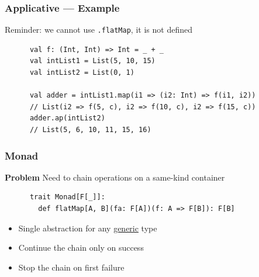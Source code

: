 \begin{frame}[fragile]
  \frametitle{Applicative --- Example}

  Reminder: we cannot use \texttt{.flatMap}, it is not defined
  \begin{example}[Usage]
    \begin{lstlisting}
      val f: (Int, Int) => Int = _ + _
      val intList1 = List(5, 10, 15)
      val intList2 = List(0, 1)

      val adder = intList1.map(i1 => (i2: Int) => f(i1, i2))
      // List(i2 => f(5, c), i2 => f(10, c), i2 => f(15, c))
      adder.ap(intList2)
      // List(5, 6, 10, 11, 15, 16)
    \end{lstlisting}
  \end{example}
\end{frame}

\begin{frame}[fragile]
  \frametitle{Monad}

  \textbf{Problem} Need to chain operations on a same-kind container

  \begin{definition}
    \begin{lstlisting}
      trait Monad[F[_]]:
        def flatMap[A, B](fa: F[A])(f: A => F[B]): F[B]
    \end{lstlisting}
  \end{definition}

  \begin{itemize}
    \item Single abstraction for any \ul{generic} type
    \item Continue the chain only on success
    \item Stop the chain on first failure
  \end{itemize}
\end{frame}

